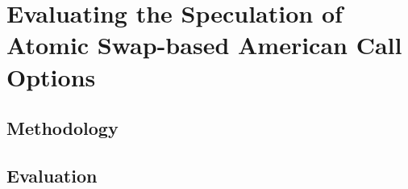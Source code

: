 \section{Evaluating the Speculation of Atomic Swap-based American Call Options}
\label{sec:evaluation}

\subsection{Methodology}

\subsection{Evaluation}